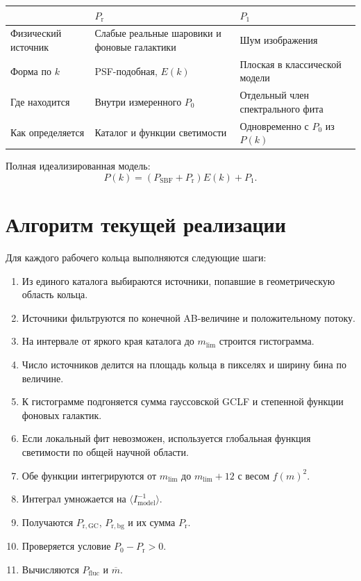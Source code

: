 \documentclass[12pt,a4paper]{article}
\newcommand{\Prpow}{P_{\mathrm r}}
\newcommand{\Psbf}{P_{\mathrm{SBF}}}
\newcommand{\Pfluc}{P_{\mathrm{fluc}}}
\begin{document}
\begin{center}
\begin{tabular}{p{}p{}p{}}
\toprule
 & \(\Prpow\) & \(P_1\) \\
\midrule
Физический источник &
Слабые реальные шаровики и фоновые галактики &
Шум изображения \\
Форма по \(k\) &
PSF-подобная, \(E(k)\) &
Плоская в классической модели \\
Где находится &
Внутри измеренного \(P_0\) &
Отдельный член спектрального фита \\
Как определяется &
Каталог и функции светимости &
Одновременно с \(P_0\) из \(P(k)\) \\
\bottomrule
\end{tabular}
\end{center}

Полная идеализированная модель:
\begin{equation}
    P(k)=
    \left(\Psbf+\Prpow\right)E(k)+P_1.
\end{equation}

\section{Алгоритм текущей реализации}

Для каждого рабочего кольца выполняются следующие шаги:
\begin{enumerate}
    \item Из единого каталога выбираются источники, попавшие
    в геометрическую область кольца.
    \item Источники фильтруются по конечной AB-величине и
    положительному потоку.
    \item На интервале от яркого края каталога до
    \(m_{\mathrm{lim}}\) строится гистограмма.
    \item Число источников делится на площадь кольца в пикселях
    и ширину бина по величине.
    \item К гистограмме подгоняется сумма гауссовской GCLF
    и степенной функции фоновых галактик.
    \item Если локальный фит невозможен, используется
    глобальная функция светимости по общей научной области.
    \item Обе функции интегрируются от \(m_{\mathrm{lim}}\)
    до \(m_{\mathrm{lim}}+12\) с весом \(f(m)^2\).
    \item Интеграл умножается на
    \(\langle I_{\mathrm{model}}^{-1}\rangle\).
    \item Получаются \(P_{\mathrm{r,GC}}\),
    \(P_{\mathrm{r,bg}}\) и их сумма \(\Prpow\).
    \item Проверяется условие \(P_0-\Prpow>0\).
    \item Вычисляются \(\Pfluc\) и
    \(\overline m\).
\end{enumerate}
\end{document}

